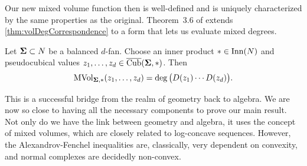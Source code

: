 \documentclass[12pt,oneside]{../../sfsuthesis}
\begin{document}
Our new mixed volume function then is well-defined and is uniquely characterized by the same properties as the original.
Theorem~3.6 of \cite{nowakMixedVolumesNormal2023} extends \th\ref{thm:volDegCorrespondence} to a form that lets us evaluate mixed degrees.
\begin{theorem}\th\label{thm:mixedDeg}
    Let \( \bm{\Sigma} \subset N \) be a balanced \( d \)-fan.
    Choose an inner product \( \ast \in \operatorname{Inn}(N) \) and pseudocubical values \( z_1, \dots, z_d \in \operatorname{\overline{Cub}}( \bm{\Sigma}, \ast ) \).
    Then
    \[
        \operatorname{MVol}_{\bm{\Sigma}, \ast}(z_1, \dots, z_d) = \deg\big( D(z_1) \cdots D(z_d) \big).
    \]
\end{theorem}
This is a successful bridge from the realm of geometry back to algebra.
We are now so close to having all the necessary components to prove our main result.
Not only do we have the link between geometry and algebra, it uses the concept of mixed volumes, which are closely related to log-concave sequences.
However, the Alexandrov-Fenchel inequalities are, classically, very dependent on convexity, and normal complexes are decidedly non-convex.
\end{document}
